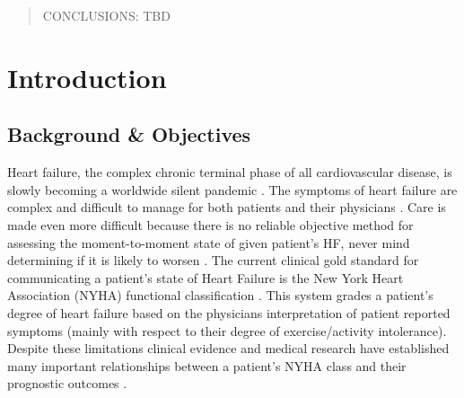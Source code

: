 \documentclass[]{article}
\begin{document}
\begin{abstract}
\noindent CONCLUSIONS: TBD %


\end{abstract}

\clearpage

\tableofcontents

\clearpage

\section{Introduction}
\subsection{Background \& Objectives} %

Heart failure, the complex chronic terminal phase of all cardiovascular disease, is slowly becoming a worldwide silent pandemic \cite{Mehra2015}. The symptoms of heart failure are complex and difficult to manage for both patients and their physicians \cite{HeartandStrokeFoundation2016,Seto2011,Lawrence2016}. Care is made even more difficult because there is no reliable objective method for assessing the moment-to-moment state of given patient’s HF, never mind determining if it is likely to worsen \cite{Cox1992,Raphael2007,Bennett2002}. The current clinical gold standard for communicating a patient’s state of Heart Failure is the New York Heart Association (NYHA) functional classification \cite{HeartFoundation2014,AmericanHeartAssociation2015}. This system grades a patient's degree of heart failure based on the physicians interpretation of patient reported symptoms (mainly with respect to their degree of exercise/activity intolerance). Despite these limitations clinical evidence and medical research have established many important relationships between a patient's NYHA class and their prognostic outcomes \cite{Bennett2002,Ahmed2006}. 
\end{document}
